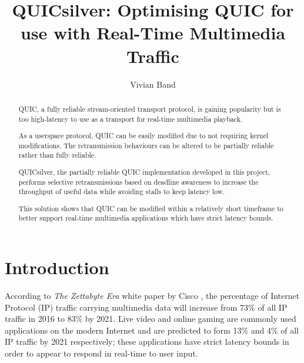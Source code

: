 \documentclass{mpaper}
\begin{document}
\title{QUICsilver: Optimising QUIC for use with Real-Time Multimedia Traffic}
\author{Vivian Band}

\maketitle

\begin{abstract}
  QUIC, a fully reliable stream-oriented transport protocol, is gaining popularity but is too high-latency to use as a transport for real-time multimedia playback.
  
    As a userspace protocol, QUIC can be easily modified due to not requiring kernel modifications. The retransmission behaviours can be altered to be partially reliable rather than fully reliable.
  
  QUICsilver, the partially reliable QUIC implementation developed in this project, performs selective retransmissions based on deadline awareness to increase the throughput of useful data while avoiding stalls to keep latency low.
  
  This solution shows that QUIC can be modified within a relatively short timeframe to better support real-time multimedia applications which have strict latency bounds.
  

\end{abstract}

\section{Introduction}

%
According to \textit{The Zettabyte Era} white paper by Cisco \cite{CISCO2015}, the percentage of Internet Protocol (IP)\cite{IP-RFC} traffic carrying multimedia data will increase from 73\% of all IP traffic in 2016 to 83\% by 2021. Live video and online gaming are commonly used applications on the modern Internet and are predicted to form 13\% and 4\% of all IP traffic by 2021 respectively; these applications have strict latency bounds in order to appear to respond in real-time to user input.
\end{document}
